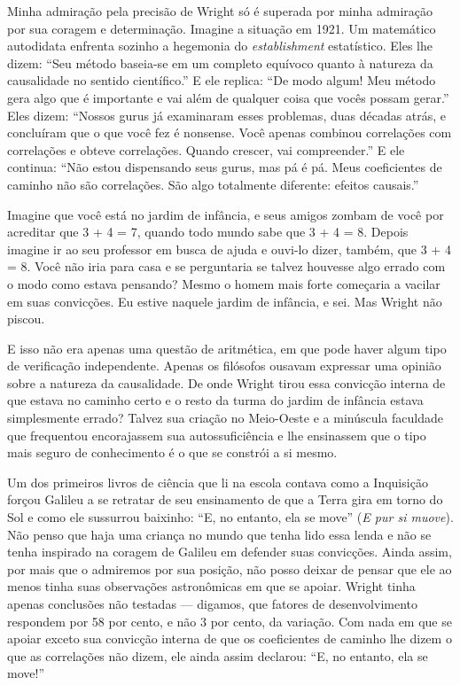\documentclass[11pt,a5paper,twoside]{book}
\begin{document}
Minha admiração pela precisão de Wright só é superada por minha admiração por sua coragem e determinação. Imagine a situação em 1921. Um matemático autodidata enfrenta sozinho a hegemonia do \textit{establishment} estatístico. Eles lhe dizem: “Seu método baseia-se em um completo equívoco quanto à natureza da causalidade no sentido científico.” E ele replica: “De modo algum! Meu método gera algo que é importante e vai além de qualquer coisa que vocês possam gerar.” Eles dizem: “Nossos gurus já examinaram esses problemas, duas décadas atrás, e concluíram que o que você fez é nonsense. Você apenas combinou correlações com correlações e obteve correlações. Quando crescer, vai compreender.” E ele continua: “Não estou dispensando seus gurus, mas pá é pá. Meus coeficientes de caminho não são correlações. São algo totalmente diferente: efeitos causais.”

Imagine que você está no jardim de infância, e seus amigos zombam de você por acreditar que 3 + 4 = 7, quando todo mundo sabe que 3 + 4 = 8. Depois imagine ir ao seu professor em busca de ajuda e ouvi-lo dizer, também, que 3 + 4 = 8. Você não iria para casa e se perguntaria se talvez houvesse algo errado com o modo como estava pensando? Mesmo o homem mais forte começaria a vacilar em suas convicções. Eu estive naquele jardim de infância, e sei. Mas Wright não piscou.

E isso não era apenas uma questão de aritmética, em que pode haver algum tipo de verificação independente. Apenas os filósofos ousavam expressar uma opinião sobre a natureza da causalidade. De onde Wright tirou essa convicção interna de que estava no caminho certo e o resto da turma do jardim de infância estava simplesmente errado? Talvez sua criação no Meio-Oeste e a minúscula faculdade que frequentou encorajassem sua autossuficiência e lhe ensinassem que o tipo mais seguro de conhecimento é o que se constrói a si mesmo.

Um dos primeiros livros de ciência que li na escola contava como a Inquisição forçou Galileu a se retratar de seu ensinamento de que a Terra gira em torno do Sol e como ele sussurrou baixinho: “E, no entanto, ela se move” (\textit{E pur si muove}). Não penso que haja uma criança no mundo que tenha lido essa lenda e não se tenha inspirado na coragem de Galileu em defender suas convicções. Ainda assim, por mais que o admiremos por sua posição, não posso deixar de pensar que ele ao menos tinha suas observações astronômicas em que se apoiar. Wright tinha apenas conclusões não testadas — digamos, que fatores de desenvolvimento respondem por 58 por cento, e não 3 por cento, da variação. Com nada em que se apoiar exceto sua convicção interna de que os coeficientes de caminho lhe dizem o que as correlações não dizem, ele ainda assim declarou: “E, no entanto, ela se move!”
\end{document}
